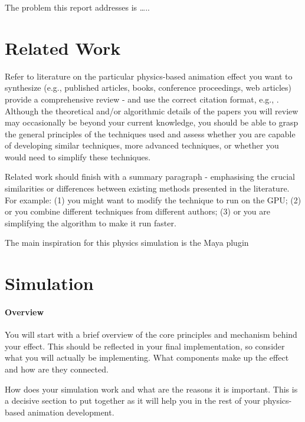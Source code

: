 \documentclass[conference,backref=page]{acmsiggraph}
\begin{document}
The problem this report addresses is …..


\section{Related Work}
Refer to literature on the particular physics-based animation effect you want to synthesize (e.g., published articles, books, conference proceedings, web articles) provide a comprehensive review - and use the correct citation format, e.g., \cite{Sako00}. Although the theoretical and/or algorithmic details of the papers you will review may occasionally be beyond your current knowledge, you should be able to grasp the general principles of the techniques used and assess whether you are capable of developing similar techniques, more advanced techniques, or whether you would need to simplify these techniques. 



Related work should finish with a summary paragraph - emphasising the crucial similarities or differences between existing methods presented in the literature.  For example: (1) you might want to modify the technique to run on the GPU; (2) or you combine different techniques from different authors; (3) or you are simplifying the algorithm to make it run faster.



The main inspiration for this physics simulation is the Maya plugin 
\section{Simulation}

\paragraph{Overview}
You will start with a brief overview of the core principles and mechanism behind your effect.  This should be reflected in your final implementation, so consider what you will actually be implementing. What components make up the effect and how are they connected.

How does your simulation work and what are the reasons it is important.  This is a decisive section to put together as it will help you in the rest of your physics-based animation development.
\end{document}
